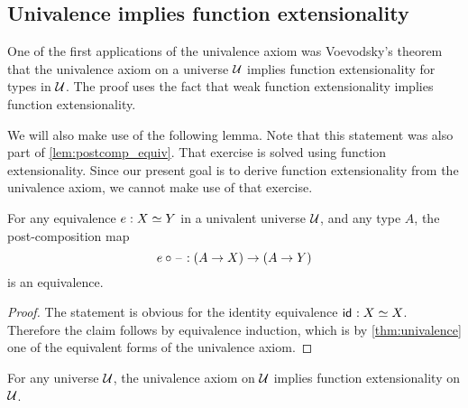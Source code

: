 \subsection{Univalence implies function extensionality}
One of the first applications of the univalence axiom was Voevodsky's theorem that the univalence axiom on a universe $\mathcal{U}$ implies function extensionality for types in $\mathcal{U}$. The proof uses the fact that weak function extensionality implies function extensionality.

We will also make use of the following lemma. Note that this statement was also part of \cref{lem:postcomp_equiv}. That exercise is solved using function extensionality. Since our present goal is to derive function extensionality from the univalence axiom, we cannot make use of that exercise.

\begin{lem}\label{lem:postcomp-equiv}
  For any equivalence $e:\eqv{X}{Y}$ in a univalent universe $\mathcal{U}$, and any type $A$, the post-composition map
  \begin{equation*}
    e\circ\mathord{\hspace{1pt}\text{--}\hspace{1pt}} : (A \to X) \to (A\to Y)
  \end{equation*}
  is an equivalence.
\end{lem}

\begin{proof}
  The statement is obvious for the identity equivalence $\idfunc : \eqv{X}{X}$. Therefore the claim follows by equivalence induction, which is by \cref{thm:univalence} one of the equivalent forms of the univalence axiom.
\end{proof}

\begin{thm}\label{thm:funext-univalence}
  For any universe $\mathcal{U}$, the univalence axiom on $\mathcal{U}$ implies function extensionality on $\mathcal{U}$.
\end{thm}

